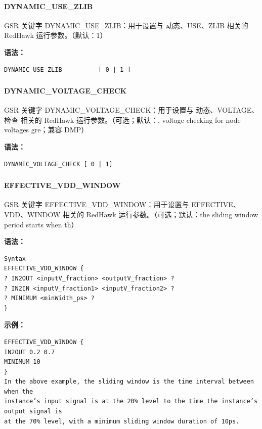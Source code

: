 \paragraph*{DYNAMIC_USE_ZLIB}

GSR 关键字 DYNAMIC_USE_ZLIB：用于设置与 动态、USE、ZLIB 相关的 RedHawk 运行参数。（默认：1）

\textbf{语法：}
\begin{lstlisting}
DYNAMIC_USE_ZLIB          [ 0 | 1 ]
\end{lstlisting}

\subsubsection{}
\paragraph*{DYNAMIC_VOLTAGE_CHECK}

GSR 关键字 DYNAMIC_VOLTAGE_CHECK：用于设置与 动态、VOLTAGE、检查 相关的 RedHawk 运行参数。（可选；默认：, voltage checking for node voltages gre；兼容 DMP）

\textbf{语法：}
\begin{lstlisting}
DYNAMIC_VOLTAGE_CHECK [ 0 | 1]
\end{lstlisting}

\subsubsection{}
\paragraph*{EFFECTIVE_VDD_WINDOW}

GSR 关键字 EFFECTIVE_VDD_WINDOW：用于设置与 EFFECTIVE、VDD、WINDOW 相关的 RedHawk 运行参数。（可选；默认：the sliding window period starts when th）

\textbf{语法：}
\begin{lstlisting}
Syntax
EFFECTIVE_VDD_WINDOW {
? IN2OUT <inputV_fraction> <outputV_fraction> ?
? IN2IN <inputV_fraction1> <inputV_fraction2> ?
? MINIMUM <minWidth_ps> ?
}
\end{lstlisting}

\textbf{示例：}
\begin{lstlisting}
EFFECTIVE_VDD_WINDOW {
IN2OUT 0.2 0.7
MINIMUM 10
}
In the above example, the sliding window is the time interval between when the
instance’s input signal is at the 20% level to the time the instance’s output signal is
at the 70% level, with a minimum sliding window duration of 10ps.
\end{lstlisting}

